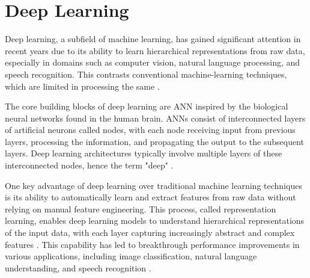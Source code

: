 \section{Deep Learning} 
Deep learning, a subfield of machine learning, has gained significant attention in recent years due to its ability to learn hierarchical representations from raw data, especially in domains such as computer vision, natural language processing, and speech recognition. This contrasts conventional machine-learning techniques, which are limited in processing the same \autocite{lecun2015deep}. 

The core building blocks of deep learning are \Gls{ANN} inspired by the biological neural networks found in the human brain. \gls{ANN}s consist of interconnected layers of artificial neurons called nodes, with each node receiving input from previous layers, processing the information, and propagating the output to the subsequent layers. Deep learning architectures typically involve multiple layers of these interconnected nodes, hence the term "deep" \autocite{goodfellow2016deep}.

One key advantage of deep learning over traditional machine learning techniques is its ability to automatically learn and extract features from raw data without relying on manual feature engineering. This process, called representation learning, enables deep learning models to understand hierarchical representations of the input data, with each layer capturing increasingly abstract and complex features \autocite{bengio2013representation}. This capability has led to breakthrough performance improvements in various applications, including image classification, natural language understanding, and speech recognition \autocite{krizhevsky2017imagenet}.
